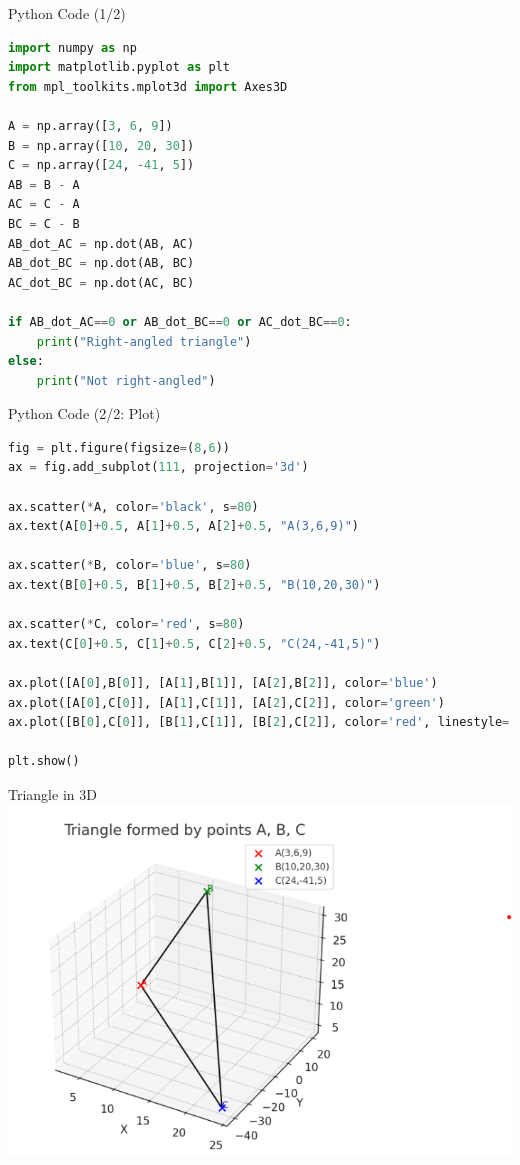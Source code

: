 \documentclass{beamer}
\begin{document}
\begin{frame}[fragile]{Python Code (1/2)}
\begin{lstlisting}[language=Python]
import numpy as np
import matplotlib.pyplot as plt
from mpl_toolkits.mplot3d import Axes3D

A = np.array([3, 6, 9])
B = np.array([10, 20, 30])
C = np.array([24, -41, 5])
AB = B - A
AC = C - A
BC = C - B
AB_dot_AC = np.dot(AB, AC)
AB_dot_BC = np.dot(AB, BC)
AC_dot_BC = np.dot(AC, BC)

if AB_dot_AC==0 or AB_dot_BC==0 or AC_dot_BC==0:
    print("Right-angled triangle")
else:
    print("Not right-angled")
\end{lstlisting}
\end{frame}

\begin{frame}[fragile]{Python Code (2/2: Plot)}
\begin{lstlisting}[language=Python]
fig = plt.figure(figsize=(8,6))
ax = fig.add_subplot(111, projection='3d')

ax.scatter(*A, color='black', s=80)
ax.text(A[0]+0.5, A[1]+0.5, A[2]+0.5, "A(3,6,9)")

ax.scatter(*B, color='blue', s=80)
ax.text(B[0]+0.5, B[1]+0.5, B[2]+0.5, "B(10,20,30)")

ax.scatter(*C, color='red', s=80)
ax.text(C[0]+0.5, C[1]+0.5, C[2]+0.5, "C(24,-41,5)")

ax.plot([A[0],B[0]], [A[1],B[1]], [A[2],B[2]], color='blue')
ax.plot([A[0],C[0]], [A[1],C[1]], [A[2],C[2]], color='green')
ax.plot([B[0],C[0]], [B[1],C[1]], [B[2],C[2]], color='red', linestyle='--')

plt.show()
\end{lstlisting}
\end{frame}

\begin{frame}{Triangle in 3D}
\centering
\includegraphics[width=0.7\columnwidth]{figs/plot3.png}
\end{frame}
\end{document}
